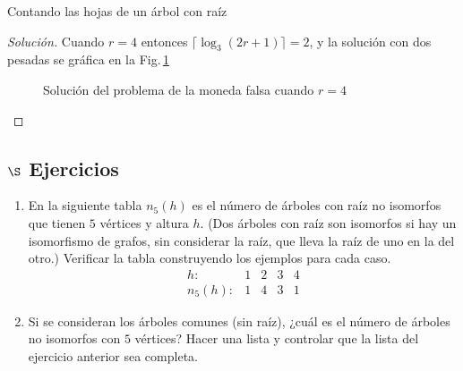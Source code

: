 \begin{section}{Contando las hojas de un árbol con raíz}
\begin{proof}[Solución]
Cuando $r=4$ entonces $\lceil \log_3(2r+1)\rceil=2$, y la solución con dos pesadas se gráfica en la Fig.\-\,\ref{f6.2}

\begin{figure}[ht]
    \begin{center}
    \end{center}
    \caption{Solución del problema de la moneda falsa cuando $r=4$}
    \label{f6.2}
\end{figure}

\end{proof}

\subsection*{$\S$ Ejercicios}
\begin{enumerate}
\item En la siguiente tabla $n_5(h)$ es el número de árboles con raíz no isomorfos que tienen $5$ vértices y altura $h$. (Dos árboles con raíz son isomorfos si hay un isomorfismo de grafos, sin considerar la raíz, que lleva la raíz de uno en la del otro.) Verificar la tabla construyendo los ejemplos para cada caso.
$$
\begin{matrix}
h: &1 &2 &3 &4 \\
n_5(h): &1 &4 & 3 &1
\end{matrix}
$$
\item Si se consideran los árboles comunes (sin raíz), ¿cuál es el número de árboles no isomorfos con $5$ vértices? Hacer una lista y controlar que la lista del ejercicio anterior sea completa.


\end{enumerate}
\end{section}

